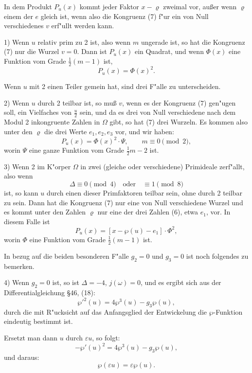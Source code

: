 \documentclass[12pt,a4paper]{article}
\begin{document}
In dem Produkt $P_u(x)$ kommt jeder Faktor $x - \varrho$ zweimal vor, au\ss{}er wenn $\varrho$ einem der $e$ gleich ist, wenn also die Kongruenz (7) f"ur ein von Null verschiedenes $v$ erf"ullt werden kann.

1) Wenn $u$ relativ prim zu 2 ist, also wenn $m$ ungerade ist, so hat die Kongruenz (7) nur die Wurzel $v = 0$. Dann ist $P_u(x)$ ein Quadrat, und wenn $\Phi(x)$ eine Funktion vom Grade $\frac{1}{2}(m-1)$ ist,
\begin{equation}P_u(x) = \Phi(x)^2.\end{equation}

Wenn $u$ mit 2 einen Teiler gemein hat, sind drei F"alle zu unterscheiden.

2) Wenn $u$ durch 2 teilbar ist, so mu\ss{} $v$, wenn es der Kongruenz (7) gen"ugen soll, ein Vielfaches von $\frac{u}{2}$ sein, und da es drei von Null verschiedene nach dem Modul 2 inkongruente Zahlen in $\Omega$ gibt, so hat (7) drei Wurzeln. Es kommen also unter den $\varrho$ die drei Werte $e_1, e_2, e_3$ vor, und wir haben:
\begin{equation}P_u(x) = \Phi(x)^2 \cdot \Psi, \qquad m \equiv 0 \pmod{2},\end{equation}
worin $\Psi$ eine ganze Funktion vom Grade $\frac{1}{2}m - 2$ ist.

3) Wenn 2 im K"orper $\Omega$ in zwei (gleiche oder verschiedene) Primideale zerf"allt, also wenn
\[\Delta \equiv 0 \pmod{4} \quad \text{oder} \quad \equiv 1 \pmod{8}\]
ist, so kann $u$ durch einen dieser Primfaktoren teilbar sein, ohne durch 2 teilbar zu sein. Dann hat die Kongruenz (7) nur eine von Null verschiedene Wurzel und es kommt unter den Zahlen $\varrho$ nur eine der drei Zahlen (6), etwa $e_1$, vor. In diesem Falle ist
\begin{equation}P_u(x) = [x - \wp(u) - e_1] \cdot \Phi^2,\end{equation}
worin $\Phi$ eine Funktion vom Grade $\frac{1}{2}(m-1)$ ist.

In bezug auf die beiden besonderen F"alle $g_2 = 0$ und $g_3 = 0$ ist noch folgendes zu bemerken.

4) Wenn $g_2 = 0$ ist, so ist $\Delta = -4$, $j(\omega) = 0$, und es ergibt sich aus der Differentialgleichung \S 46, (18):
\[\wp'^2(u) = 4\wp^3(u) - g_3\wp(u),\]
durch die mit R"ucksicht auf das Anfangsglied der Entwickelung die $\wp$-Funktion eindeutig bestimmt ist.

Ersetzt man dann $u$ durch $\varepsilon u$, so folgt:
\[-\wp'(u)^2 = 4\wp^3(u) - g_3\wp(u),\]
und daraus:
\[\wp(\varepsilon u) = \varepsilon\wp(u).\]
\end{document}
